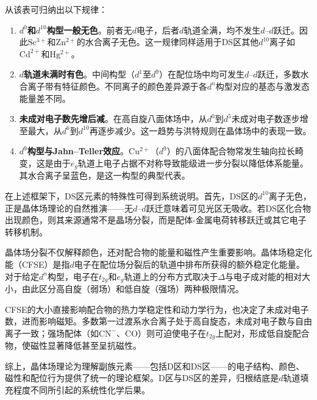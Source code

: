 \documentclass[UTF8]{ctexbook}
\begin{document}
从该表可归纳出以下规律：

\begin{enumerate}
    \item \textbf{$d^0$和$d^{10}$构型一般无色}。前者无$d$电子，后者$d$轨道全满，均不发生$d$--$d$跃迁。因此$\mathrm{Sc^{3+}}$和$\mathrm{Zn^{2+}}$的水合离子无色。这一规律同样适用于DS区其他$d^{10}$离子如$\mathrm{Cd^{2+}}$和$\mathrm{Hg^{2+}}$。
    
    \item \textbf{$d$轨道未满时有色}。中间构型（$d^1$至$d^9$）在配位场中均可发生$d$--$d$跃迁，多数水合离子带有特征颜色。不同离子的颜色差异源于各$d^n$构型对应的基态与激发态能量差不同。
    
    \item \textbf{未成对电子数先增后减}。在高自旋八面体场中，从$d^0$到$d^5$未成对电子数逐步增至最大，从$d^6$到$d^{10}$再逐步减少。这一趋势与洪特规则在晶体场中的表现一致。
    
    \item \textbf{$d^9$构型与Jahn--Teller效应}。$\mathrm{Cu^{2+}}$（$d^9$）的八面体配合物常发生轴向拉长畸变，这是由于$e_g$轨道上电子占据不对称导致能级进一步分裂以降低体系能量。其水合离子呈蓝色，是这一构型的典型代表。
\end{enumerate}


在上述框架下，DS区元素的特殊性可得到系统说明。首先，DS区的$d^{10}$离子无色，正是晶体场理论的自然推演——无$d$--$d$跃迁意味着可见光区无吸收。若DS区化合物出现颜色，则其来源通常不是晶场分裂，而是配体-金属电荷转移跃迁或其它电子转移机制。

晶体场分裂不仅解释颜色，还对配合物的能量和磁性产生重要影响。晶体场稳定化能（CFSE）是指$d$电子在配位场分裂后的轨道中排布所获得的额外稳定化能量。对于给定$d^n$构型，电子在$t_{2g}$和$e_g$轨道上的分布方式取决于$\Delta$与电子成对能的相对大小，由此区分高自旋（弱场）和低自旋（强场）两种极限情况。

CFSE的大小直接影响配合物的热力学稳定性和动力学行为，也决定了未成对电子数，进而影响磁矩。多数第一过渡系水合离子处于高自旋态，未成对电子数与自由离子一致；强场配体（如$\mathrm{CN^-}$、$\mathrm{CO}$）则可迫使电子在$t_{2g}$上配对，形成低自旋配合物，使磁性显著降低甚至呈抗磁性。




综上，晶体场理论为理解副族元素——包括D区和DS区——的电子结构、颜色、磁性和配位行为提供了统一的理论框架。D区与DS区的差异，归根结底是$d$轨道填充程度不同所引起的系统性化学后果。

\newpage


\end{document}
